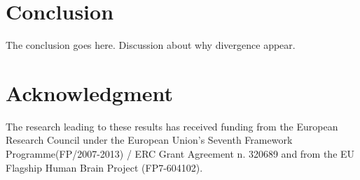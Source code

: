 \documentclass{article}
\begin{document}




\section{Conclusion}
The conclusion goes here.
Discussion about why divergence appear.





\section*{Acknowledgment}
The research leading to these results has received funding from the European Research Council under the European Union's Seventh Framework Programme(FP/2007-2013) / ERC Grant Agreement n. 320689 and from the EU Flagship Human Brain Project (FP7-604102).







%
%
%
%
%




\end{document}
